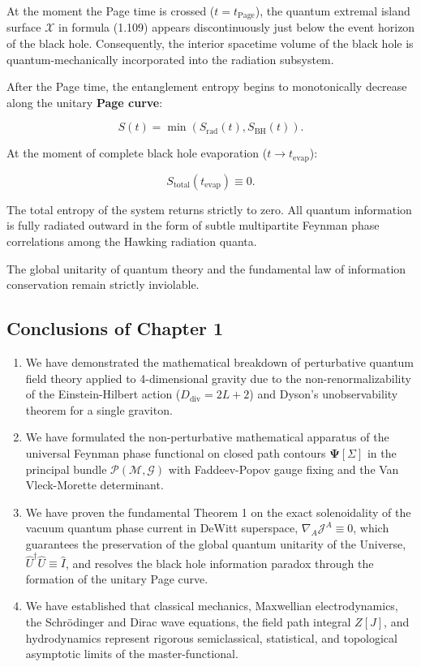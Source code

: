 \documentclass[11pt,a4paper]{article}
\theoremstyle{definition}
\begin{document}
At the moment the Page time is crossed ($t = t_{\text{Page}}$), the quantum extremal island surface $\mathcal{X}$ in formula (1.109) appears discontinuously just below the event horizon of the black hole. Consequently, the interior spacetime volume of the black hole is quantum-mechanically incorporated into the radiation subsystem.

After the Page time, the entanglement entropy begins to monotonically decrease along the unitary \textbf{Page curve}:

\begin{equation}\label{eq:1.121}\tag{1.121}
S(t) = \min\left( S_{\text{rad}}(t), S_{\text{BH}}(t) \right).
\end{equation}

At the moment of complete black hole evaporation ($t \to t_{\text{evap}}$):

\begin{equation}\label{eq:1.122}\tag{1.122}
S_{\text{total}}(t_{\text{evap}}) \equiv 0.
\end{equation}

The total entropy of the system returns strictly to zero. All quantum information is fully radiated outward in the form of subtle multipartite Feynman phase correlations among the Hawking radiation quanta.

The global unitarity of quantum theory and the fundamental law of information conservation remain strictly inviolable.

\subsection{Conclusions of Chapter 1}\label{sec:1.6}

\begin{enumerate}
\item We have demonstrated the mathematical breakdown of perturbative quantum field theory applied to 4-dimensional gravity due to the non-renormalizability of the Einstein-Hilbert action ($D_{\text{div}} = 2L + 2$) and Dyson's unobservability theorem for a single graviton.
\item We have formulated the non-perturbative mathematical apparatus of the universal Feynman phase functional on closed path contours $\mathbf{\Psi}[\Sigma]$ in the principal bundle $\mathcal{P}(\mathcal{M}, \mathcal{G})$ with Faddeev-Popov gauge fixing and the Van Vleck-Morette determinant.
\item We have proven the fundamental Theorem 1 on the exact solenoidality of the vacuum quantum phase current in DeWitt superspace, $\nabla_A \mathcal{J}^A \equiv 0$, which guarantees the preservation of the global quantum unitarity of the Universe, $\hat{U}^\dagger \hat{U} \equiv \hat{I}$, and resolves the black hole information paradox through the formation of the unitary Page curve.
\item We have established that classical mechanics, Maxwellian electrodynamics, the Schr\"odinger and Dirac wave equations, the field path integral $Z[J]$, and hydrodynamics represent rigorous semiclassical, statistical, and topological asymptotic limits of the master-functional.
\end{enumerate}
\end{document}
